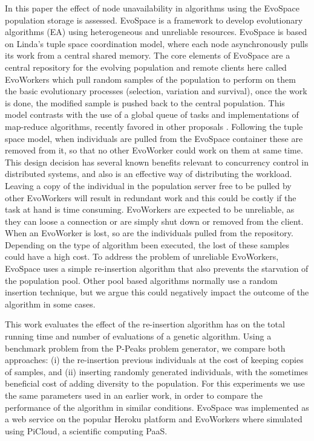 \documentclass{llncs}
\begin{document}
In this paper the effect of node unavailability in algorithms using the 
EvoSpace population storage is assessed. EvoSpace \cite{Evospace,FreeLunch} is
a framework to develop evolutionary algorithms (EA) using 
heterogeneous and unreliable resources. EvoSpace is based on Linda's tuple
space \cite{Evospace} coordination model, where each node asynchronously
pulls its work from a central shared memory. The core elements of EvoSpace are a central 
repository for the evolving population and remote clients here called EvoWorkers
which pull random samples of the population to perform on them the basic evolutionary
processes (selection, variation and survival), once the work is done, the
modified sample is pushed back to the central population.
This model contrasts with  the use of a global queue of tasks and
implementations of map-reduce algorithms, recently favored in other proposals 
\cite{fazenda2012,di2013towards,FlexGP}.
Following the tuple space model, when individuals are pulled from the EvoSpace
container these are removed from it, so that no other EvoWorker could work on them at same time.
This design decision has several known benefits relevant to concurrency control 
in distributed systems, and also is an effective way of distributing the
workload. Leaving a copy of the individual in the population server free to
be pulled by other EvoWorkers will result in redundant work and this could be
costly if the task at hand is time consuming. EvoWorkers are expected to be 
unreliable, as they can loose a connection or are simply shut down or removed 
from the client. When an EvoWorker is lost, so are the individuals pulled from
the repository. Depending on the type of algorithm been executed, the lost of
these samples could have a high cost. To address the problem of unreliable 
EvoWorkers, EvoSpace uses a simple re-insertion algorithm that also 
prevents the starvation of the population pool. Other pool based algorithms
normally use a random insertion technique, but we argue this could negatively 
impact the outcome of the algorithm in some cases.  %

This work evaluates the effect 
of the re-insertion algorithm has on the total running time and number of evaluations 
of a genetic algorithm. Using  a benchmark problem from the P-Peaks 
problem generator, we compare both approaches: (i) the re-insertion previous
individuals at the cost of keeping copies of samples, and (ii) inserting  
randomly generated individuals, with the sometimes beneficial cost of 
adding diversity to the population. For this experiments we use the same
parameters used in an earlier work, in order to compare the 
performance of the algorithm in similar conditions.
EvoSpace was implemented as a web service on the popular Heroku platform 
and EvoWorkers where simulated using PiCloud, a scientific computing PaaS. 
\end{document}
